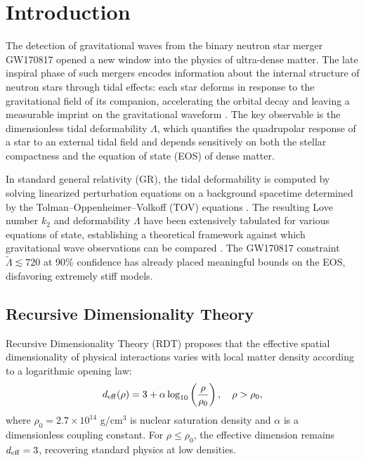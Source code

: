 \documentclass[twocolumn,showpacs,preprintnumbers,amsmath,amssymb,prd]{revtex4-2}
\begin{document}
\section{Introduction}
\label{sec:intro}

The detection of gravitational waves from the binary neutron star merger GW170817 \cite{Abbott2017} opened a new window into the physics of ultra-dense matter. The late inspiral phase of such mergers encodes information about the internal structure of neutron stars through tidal effects: each star deforms in response to the gravitational field of its companion, accelerating the orbital decay and leaving a measurable imprint on the gravitational waveform \cite{Flanagan2008,Hinderer2008}. The key observable is the dimensionless tidal deformability $\Lambda$, which quantifies the quadrupolar response of a star to an external tidal field and depends sensitively on both the stellar compactness and the equation of state (EOS) of dense matter.

In standard general relativity (GR), the tidal deformability is computed by solving linearized perturbation equations on a background spacetime determined by the Tolman--Oppenheimer--Volkoff (TOV) equations \cite{Hinderer2008,Damour2009}. The resulting Love number $k_2$ and deformability $\Lambda$ have been extensively tabulated for various equations of state, establishing a theoretical framework against which gravitational wave observations can be compared \cite{Postnikov2010,Lackey2015}. The GW170817 constraint $\tilde{\Lambda} \lesssim 720$ at 90\% confidence \cite{Abbott2018} has already placed meaningful bounds on the EOS, disfavoring extremely stiff models.

\subsection{Recursive Dimensionality Theory}
\label{sec:intro_rdt}

Recursive Dimensionality Theory (RDT) proposes that the effective spatial dimensionality of physical interactions varies with local matter density according to a logarithmic opening law:
\begin{equation}
d_{\rm eff}(\rho) = 3 + \alpha \log_{10}\left(\frac{\rho}{\rho_0}\right), \quad \rho > \rho_0,
\label{eq:deff}
\end{equation}
where $\rho_0 = 2.7 \times 10^{14}$ g/cm$^3$ is nuclear saturation density and $\alpha$ is a dimensionless coupling constant. For $\rho \leq \rho_0$, the effective dimension remains $d_{\rm eff} = 3$, recovering standard physics at low densities.
\end{document}
